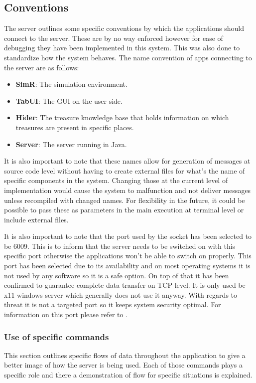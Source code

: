 \documentclass{report}
\begin{document}
      \subsection{Conventions}
        The server outlines some specific conventions by which the applications should connect to the server. These are by no way enforced however for ease of debugging they have been implemented in this system. This was also done to standardize how the system behaves. The name convention of apps connecting to the server are as follows:

          \begin{itemize}
            \item \textbf{SimR}: The simulation environment.
            \item \textbf{TabUI}: The GUI on the user side.
            \item \textbf{Hider}: The treasure knowledge base that holds information on which treasures are present in specific places.
            \item \textbf{Server}: The server running in Java.
          \end{itemize}

        It is also important to note that these names allow for generation of messages at source code level without having to create external files for what's the name of specific components in the system. Changing those at the current level of implementation would cause the system to malfunction and not deliver messages unless recompiled with changed names. For flexibility in the future, it could be possible to pass these as parameters in the main execution at terminal level or include external files.

        It is also important to note that the port used by the socket has been selected to be 6009. This is to inform that the server needs to be switched on with this specific port otherwise the applications won't be able to switch on properly. This port has been selected due to its availability and on most operating systems it is not used by any software so it is a safe option. On top of that it has been confirmed to guarantee complete data transfer on TCP level. It is only used be x11 windows server which generally does not use it anyway. With regards to threat it is not a targeted port so it keeps system security optimal. For information on this port please refer to \cite{port6009}.

      \subsubsection{Use of specific commands}
        This section outlines specific flows of data throughout the application to give a better image of how the server is being used. Each of those commands plays a specific role and there a demonstration of flow for specific situations is explained.
\end{document}
